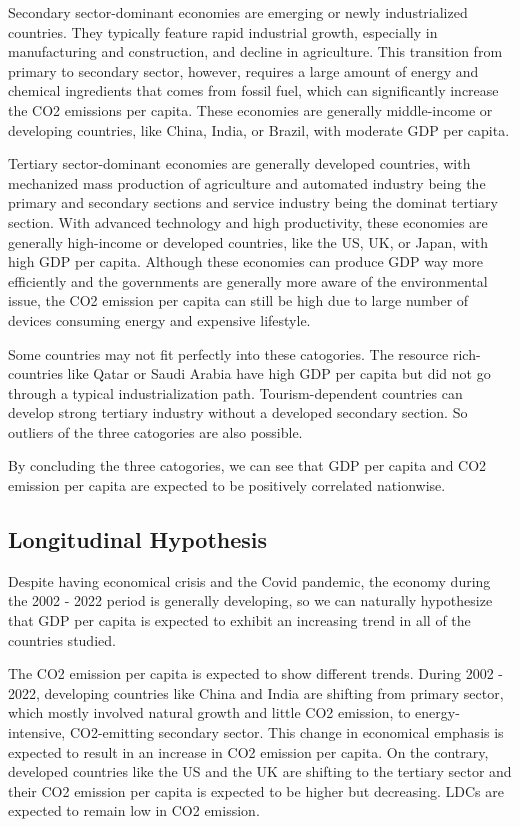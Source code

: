 \documentclass[a4paper]{article}
\begin{document}
Secondary sector-dominant economies are emerging or newly industrialized countries. They typically feature rapid industrial growth, especially in manufacturing and construction, and decline in agriculture. This transition from primary to secondary sector, however, requires a large amount of energy and chemical ingredients that comes from fossil fuel, which can significantly increase the CO2 emissions per capita. These economies are generally middle-income or developing countries, like China, India, or Brazil, with moderate GDP per capita.

Tertiary sector-dominant economies are generally developed countries, with mechanized mass production of agriculture and automated industry being the primary and secondary sections and service industry being the dominat tertiary section. With advanced technology and high productivity, these economies are generally high-income or developed countries, like the US, UK, or Japan, with high GDP per capita. Although these economies can produce GDP way more efficiently and the governments are generally more aware of the environmental issue, the CO2 emission per capita can still be high due to large number of devices consuming energy and expensive lifestyle.

Some countries may not fit perfectly into these catogories. The resource rich-countries like Qatar or Saudi Arabia have high GDP per capita but did not go through a typical industrialization path. Tourism-dependent countries can develop strong tertiary industry without a developed secondary section. So outliers of the three catogories are also possible.

By concluding the three catogories, we can see that GDP per capita and CO2 emission per capita are expected to be positively correlated nationwise. 

\subsection{Longitudinal Hypothesis} %

Despite having economical crisis and the Covid pandemic, the economy during the 2002 - 2022 period is generally developing, so we can naturally hypothesize that GDP per capita is expected to exhibit an increasing trend in all of the countries studied.

The CO2 emission per capita is expected to show different trends. During 2002 - 2022, developing countries like China and India are shifting from primary sector, which mostly involved natural growth and little CO2 emission, to energy-intensive, CO2-emitting secondary sector. This change in economical emphasis is expected to result in an increase in CO2 emission per capita. On the contrary, developed countries like the US and the UK are shifting to the tertiary sector and their CO2 emission per capita is expected to be higher but decreasing. LDCs are expected to remain low in CO2 emission.
\end{document}
